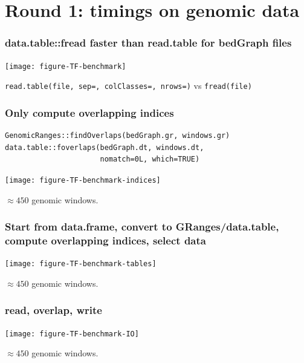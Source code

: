 \documentclass{beamer}
\begin{document}
\section{Round 1: timings on genomic data}

\begin{frame}
  \frametitle{data.table::fread faster than read.table for bedGraph
    files}
  \texttt{[image: figure-TF-benchmark]}

  \texttt{read.table(file, sep=, colClasses=, nrows=)} vs
  \texttt{fread(file)}
\end{frame}

\begin{frame}[fragile]
  \frametitle{Only compute overlapping indices}
\begin{verbatim}
GenomicRanges::findOverlaps(bedGraph.gr, windows.gr)
data.table::foverlaps(bedGraph.dt, windows.dt, 
                      nomatch=0L, which=TRUE)
\end{verbatim}

  \texttt{[image: figure-TF-benchmark-indices]}

  \vskip -0.5cm

  $\approx 450$ genomic windows.
\end{frame}

\begin{frame}
  \frametitle{Start from data.frame, convert to GRanges/data.table,
    compute overlapping indices, select data}
  \texttt{[image: figure-TF-benchmark-tables]}

  $\approx 450$ genomic windows.
\end{frame}

\begin{frame}
  \frametitle{read, overlap, write}
  \texttt{[image: figure-TF-benchmark-IO]}

  $\approx 450$ genomic windows.
\end{frame}




\end{document}
